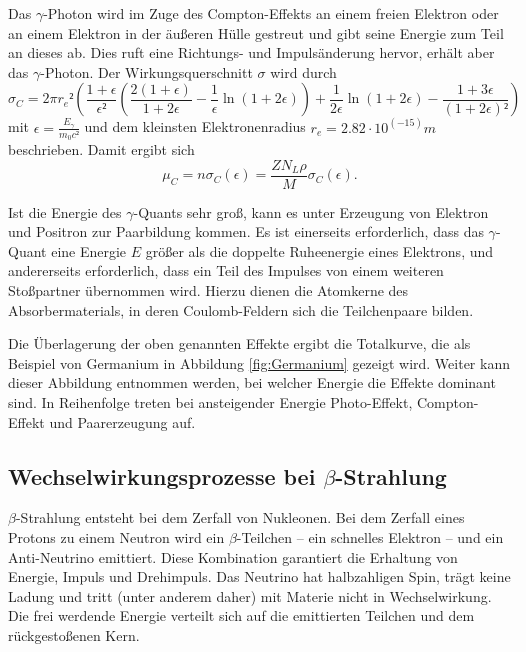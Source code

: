 Das $\gamma$-Photon wird im Zuge des Compton-Effekts an einem freien Elektron oder an einem Elektron in der äußeren Hülle gestreut und gibt seine Energie zum Teil an dieses ab. 
Dies ruft eine Richtungs- und Impulsänderung hervor, erhält aber das $\gamma$-Photon.
Der Wirkungsquerschnitt $\sigma$ wird durch
\begin{equation}
	\sigma_C=2\pi  r_e²\left(\frac{1+\epsilon}{\epsilon²}\left(\frac{2(1+\epsilon)}{1+2\epsilon}-\frac{1}{\epsilon}\ln(1+2\epsilon)\right)+\frac{1}{2\epsilon}\ln(1+2\epsilon)-\frac{1+3\epsilon}{(1+2\epsilon)²}\right)
\end{equation}
mit $\epsilon=\frac{E_{\gamma}}{m_0c²}$ und dem kleinsten Elektronenradius $r_e=2.82\cdot 10^(-15)m$ beschrieben. 
Damit ergibt sich
\begin{equation}
	\mu_C=n\sigma_C(\epsilon)=\frac{Z N_L \rho}{M}\sigma_C(\epsilon).
\end{equation}

Ist die Energie des $\gamma$-Quants sehr groß, kann es unter Erzeugung von Elektron und Positron zur Paarbildung kommen.
Es ist einerseits erforderlich, dass das $\gamma$-Quant eine Energie $E$ größer als die doppelte Ruheenergie eines Elektrons, und andererseits erforderlich, dass ein Teil des Impulses von einem weiteren Stoßpartner übernommen wird.
Hierzu dienen die Atomkerne des Absorbermaterials, in  deren Coulomb-Feldern  sich die  Teilchenpaare bilden.

Die Überlagerung der oben genannten Effekte ergibt die Totalkurve, die als Beispiel von Germanium in Abbildung \ref{fig:Germanium} gezeigt wird.
Weiter kann dieser Abbildung entnommen werden, bei welcher Energie die Effekte dominant sind.
In Reihenfolge treten bei ansteigender Energie Photo-Effekt, Compton-Effekt und Paarerzeugung auf.





\subsection{Wechselwirkungsprozesse bei \texorpdfstring{$\beta$}{Beta}-Strahlung}
\label{sec:beta}
$\beta$-Strahlung entsteht bei dem Zerfall von Nukleonen.
Bei dem Zerfall eines Protons zu einem Neutron wird ein $\beta$-Teilchen -- ein schnelles Elektron -- und ein Anti-Neutrino emittiert.
Diese Kombination garantiert die Erhaltung von Energie, Impuls und Drehimpuls.
Das Neutrino hat halbzahligen Spin, trägt keine Ladung und tritt (unter anderem daher) mit Materie nicht in Wechselwirkung.
Die frei werdende Energie verteilt sich auf die emittierten Teilchen und dem rückgestoßenen Kern.

